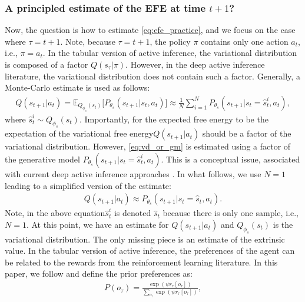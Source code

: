 \documentclass[twoside,11pt]{article}
\providecommand{\DIFadd}[1]{{\protect\color{blue}\uwave{#1}}} %
\providecommand{\DIFaddbegin}{} %
\providecommand{\DIFaddend}{} %
\begin{document}
\subsubsection{A principled estimate of the EFE at time $t + 1$?}

Now, the question is how to estimate \eqref{eq:efe_practice}, and we focus on the case where $\tau = t + 1$. Note, because $\tau = t+1$, the policy $\pi$ contains only one action $a_t$, i.e., $\pi = a_t$. In the tabular version of active inference, the variational distribution is composed of a factor $Q(s_\tau | \pi)$. However, in the deep active inference literature, the variational distribution does not contain such a factor. Generally, a Monte-Carlo estimate is used as follows:
\begin{align}
Q(s_{t+1} | a_t) = \mathbb{E}_{Q_{\phi_s}(s_t)}\big[P_{\theta_s}(s_{t+1}|s_t, a_t)\big] \approx \frac{1}{N} \sum_{i = 1}^N P_{\theta_s}(s_{t+1}|s_t = \hat{s}_t^i, a_t), \label{eq:vd_or_gm}
\end{align}
where $\hat{s}_t^i \sim Q_{\phi_s}(s_t)$. Importantly, for the expected free energy to be the expectation of the variational free energy\DIFaddbegin \DIFadd{, }\DIFaddend $Q(s_{t+1} | a_t)$ should be a factor of the variational distribution. However, \eqref{eq:vd_or_gm} is estimated using a factor of the generative model $P_{\theta_s}(s_{t+1}|s_t = \hat{s}_t^i, a_t)$. This is a conceptual issue, associated with current deep active inference approaches \DIFaddbegin \DIFadd{such as \mbox{%
\citet{DeepAIwithMCMC}}\hspace{0pt}%
}\DIFaddend .
In what follows, we use $N=1$ leading to a simplified version of the estimate:
\begin{align}
Q(s_{t+1} | a_t) \approx P_{\theta_s}(s_{t+1}|s_t = \hat{s}_t, a_t).
\end{align}
Note, in the above equation\DIFaddbegin \DIFadd{, }\DIFaddend $\hat{s}_t^i$ is denoted $\hat{s}_t$ because there is only one sample, i.e., $N=1$. At this point, we have an estimate for $Q(s_{t+1} | a_t)$ and $Q_{\phi_s}(s_t)$ is the variational distribution. The only missing piece is an estimate of the extrinsic value. In the tabular version of active inference, the preferences of the agent can be related to the rewards from the reinforcement learning literature. In this paper, we follow \citep{dacosta2020relationship} and define the prior preferences as:
\begin{align*}
P(o_\tau) = \frac{\exp(\psi r_\tau[o_\tau])}{\sum_{o_\tau} \exp(\psi r_\tau[o_\tau])},
\end{align*}
\end{document}
